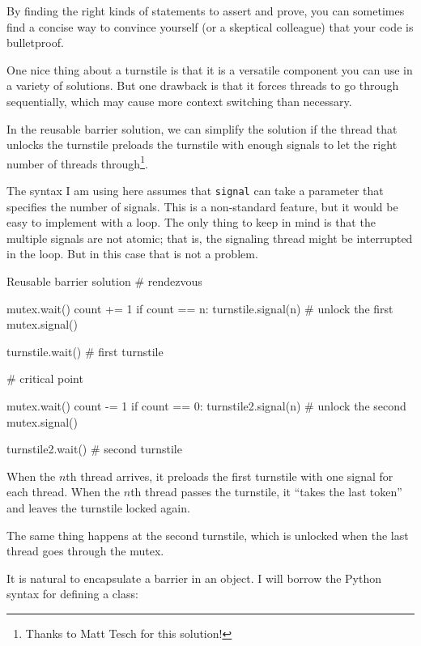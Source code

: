 By finding the right kinds of statements to assert and
prove, you can sometimes find a concise way to convince yourself
(or a skeptical colleague) that your code is bulletproof.



\blankpage
{}

One nice thing about a turnstile is that it is a versatile
component you can use in a variety of solutions.  But one
drawback is that it forces threads to go through sequentially,
which may cause more context switching than necessary.

In the reusable barrier solution, we can simplify the solution if the
thread that unlocks the turnstile preloads the turnstile with enough
signals to let the right number of threads through\footnote{Thanks to
Matt Tesch for this solution!}.

The syntax I am using here assumes that {\tt signal} can take a
parameter that specifies the number of signals.  This is a
non-standard feature, but it would be easy to implement with a loop.
The only thing to keep in mind is that the multiple signals are not
atomic; that is, the signaling thread might be interrupted in the
loop.  But in this case that is not a problem.

\begin{lstbox}{Reusable barrier solution}
# rendezvous

mutex.wait()
    count += 1
    if count == n:
        turnstile.signal(n)      # unlock the first
mutex.signal()

turnstile.wait()                 # first turnstile

# critical point

mutex.wait()
    count -= 1
    if count == 0:
        turnstile2.signal(n)     # unlock the second
mutex.signal()

turnstile2.wait()                # second turnstile
\end{lstbox}

When the $n$th thread arrives, it preloads the first turnstile with
one signal for each thread.  When the $n$th thread passes the
turnstile, it ``takes the last token'' and leaves the turnstile locked
again.

The same thing happens at the second turnstile, which is
unlocked when the last thread goes through the mutex.


\newpage
{}

It is natural to encapsulate a barrier in an object.  I will
borrow the Python syntax for defining a class:

